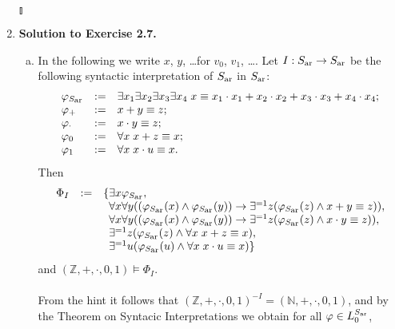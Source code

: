 \begin{enumerate}[1.]
\[\] \begin{flushright}$\talloblong$\end{flushright}
%
\item \textbf{Solution to Exercise 2.7.}
\begin{enumerate}[(a)]
\item In the following we write $x$, $y$, \ldots for $v_0$, $v_1$, \ldots. Let $I : S_{\mbox{\scriptsize ar}} \rightarrow S_{\mbox{\scriptsize ar}}$ be the following syntactic interpretation of $S_{\mbox{\scriptsize ar}}$ in $S_{\mbox{\scriptsize ar}}$:
\[
\begin{array}{lll}
\varphi_{S_{\mbox{\scriptsize ar}}} & := & \exists x_1 \exists x_2 \exists x_3 \exists x_4 \; x \equiv x_1 \cdot x_1 + x_2 \cdot x_2 + x_3 \cdot x_3 + x_4 \cdot x_4; \\
\varphi_+ & := & x + y \equiv z; \\
\varphi_\cdot & := & x \cdot y \equiv z; \\
\varphi_0 & := & \forall x \; x + z \equiv x; \\
\varphi_1 & := & \forall x \; x \cdot u \equiv x.
\end{array}
\]
Then
\[
\begin{array}{lll}
\Phi_I & := & \{ \exists x \varphi_{S_{\mbox{\scriptsize ar}}}, \\
\      & \  & \phantom{\{}\forall x \forall y ((\varphi_{S_{\mbox{\scriptsize ar}}}(x) \land \varphi_{S_{\mbox{\scriptsize ar}}}(y)) \rightarrow \exists^{=1}z(\varphi_{S_{\mbox{\scriptsize ar}}}(z) \land x + y \equiv z)), \\
\      & \  & \phantom{\{}\forall x \forall y ((\varphi_{S_{\mbox{\scriptsize ar}}}(x) \land \varphi_{S_{\mbox{\scriptsize ar}}}(y)) \rightarrow \exists^{=1}z(\varphi_{S_{\mbox{\scriptsize ar}}}(z) \land x \cdot y \equiv z)), \\
\      & \  & \phantom{\{}\exists^{=1}z(\varphi_{S_{\mbox{\scriptsize ar}}}(z) \land \forall x \; x + z \equiv x), \\
\      & \  & \phantom{\{}\exists^{=1}u(\varphi_{S_{\mbox{\scriptsize ar}}}(u) \land \forall x \; x \cdot u \equiv x)\}
\end{array}
\]
and $(\mathbb{Z}, +, \cdot, 0, 1) \models \Phi_I$.\\
\\
From the hint it follows that $(\mathbb{Z}, +, \cdot, 0, 1)^{-I} = (\mathbb{N}, +, \cdot, 0, 1)$, and by the Theorem on Syntacic Interpretations we obtain for all $\varphi \in L_0^{S_{\mbox{\tiny ar}}}$,\\

\end{enumerate}
\end{enumerate}
